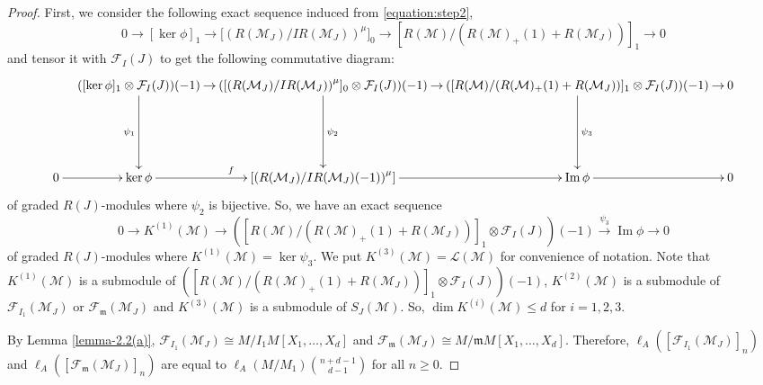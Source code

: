 \documentclass[11pt,reqno]{amsart}
\theoremstyle{definition}
\newcommand{\m}{\mathfrak m}
\def\F{{\mathcal F}}
\def\M{{\mathcal M}}
\def\L{{\mathcal L}}
\DeclareMathOperator{\im}{Im}
\numberwithin{equation}{section}
\begin{document}
\begin{proof}
First, we consider the following exact sequence induced from \eqref{equation:step2},
	$$0\to [\ker\phi]_1\to {[(R(\M_J)/IR(\M_J))}^\mu]_0\to [R(\M)/(R(\M)_+(1)+R(\M_J))]_1\to 0$$
	and tensor it with $\F_I(J)$ to get the following commutative diagram:
	{\tiny\[
	\xymatrixrowsep{20mm}\xymatrixcolsep{3mm}
	\xymatrix{
		& ([\ker \phi]_1\otimes \F_I(J))(-1) \ar[r] \ar[d]_{\psi_1}  & ({[(R(\M_J)/IR(\M_J))}^\mu]_0\otimes \F_I(J))(-1) \ar[r] \ar[d]^{\psi_2} & ([R(\M)/(R(\M)_+(1)+R(\M_J))]_1 \otimes \F_I(J))(-1) \ar[r]\ar[d]^{\psi_3} & 0 \\
		0 \ar[r] & \ker \phi\ar[r]^{f}  &  [{(R(\M_J)/IR(\M_J)(-1))}^\mu] \ar[r]  & \im{\phi} \ar[r] & 0 
	}
	\]
    }
	of graded $R(J)$-modules where $\psi_2$ is bijective. So, we have an exact sequence \begin{equation}\label{equation:step3}
		0\to K^{(1)}(\M)\to ([R(\M)/(R(\M)_+(1)+R(\M_J))]_1\otimes\F_I(J))(-1)\xrightarrow{\psi_3}\im  \phi\to 0
	\end{equation}
	of graded $R(J)$-modules where $K^{(1)}(\M)=\ker\psi_3$. We put $K^{(3)}(\M)=\L(\M)$ for convenience of notation. Note that $K^{(1)}(\M)$ is a submodule of $ ([R(\M)/(R(\M)_+(1)+R(\M_J))]_1\otimes \F_I(J))(-1)$, $K^{(2)}(\M)$ is a submodule of $ \F_{I_1}(\M_J)$ or $\F_{\m}(\M_J)$  and $K^{(3)}(\M)$ is a submodule of $ S_J(\M)$. So, $\dim K^{(i)}(\M)\leq d$ for $i=1,2,3$.   

By Lemma \ref{lemma-2.2(a)},   $\F_{I_1}(\M_J)\cong M/I_1M[X_1,\ldots,X_d]$ and $\F_{\m}(\M_J)\cong M/\m M[X_1,\ldots,X_d].$ Therefore,  $\ell_A([\F_{I_1}(\M_J)]_n)$ and $\ell_A([\F_{\m}(\M_J)]_n)$ are equal to  $\ell_A(M/M_1)\binom{n+d-1}{d-1}$ for all $n\geq 0.$ 


\end{proof}
\end{document}
